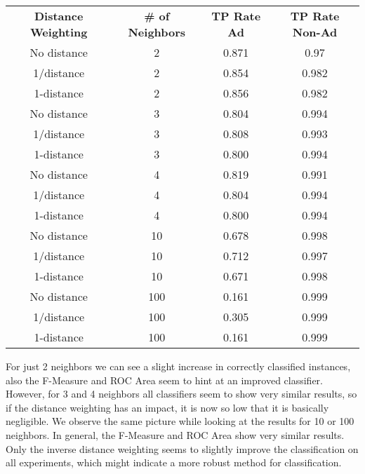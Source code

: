 \documentclass{article}
\begin{document}
\begin{center}
\begin{tabular}{c | c | c | c}
\textbf{Distance Weighting} & \textbf{\# of Neighbors} & \textbf{TP Rate Ad} & \textbf{TP Rate Non-Ad}\\
No distance & 2   & 0.871 & 0.97\\
1/distance  & 2   & 0.854 & 0.982\\
1-distance  & 2   & 0.856 & 0.982\\
No distance & 3   & 0.804 & 0.994\\
1/distance  & 3   & 0.808 & 0.993\\
1-distance  & 3   & 0.800 & 0.994\\
No distance & 4   & 0.819 & 0.991\\
1/distance  & 4   & 0.804 & 0.994\\
1-distance  & 4   & 0.800 & 0.994\\
No distance & 10  & 0.678 & 0.998\\
1/distance  & 10  & 0.712 & 0.997\\
1-distance  & 10  & 0.671 & 0.998\\
No distance & 100 & 0.161 & 0.999\\
1/distance  & 100 & 0.305 & 0.999\\
1-distance  & 100 & 0.161 & 0.999\\
\end{tabular}
\end{center}

For just 2 neighbors we can see a slight increase in correctly classified instances, also the F-Measure and ROC Area seem to hint at an improved classifier. However, for 3 and 4 neighbors all classifiers seem to show very similar results, so if the distance weighting has an impact, it is now so low that it is basically negligible. We observe the same picture while looking at the results for 10 or 100 neighbors. In general, the F-Measure and ROC Area show very similar results. Only the inverse distance weighting seems to slightly improve the classification on all experiments, which might indicate a more robust method for classification. 
\end{document}
